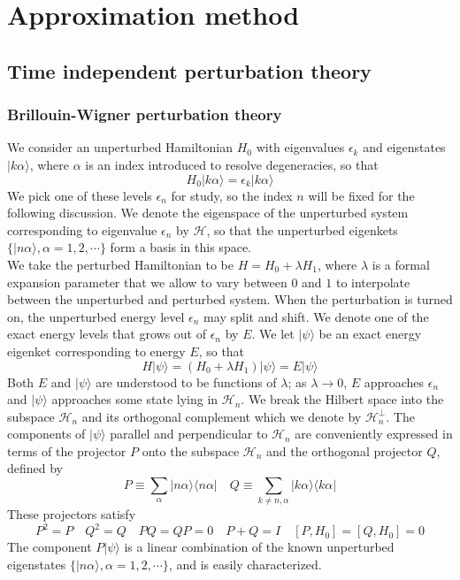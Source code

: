 \chapter{Approximation method}
\section{Time independent perturbation theory}
\subsection{Brillouin-Wigner perturbation theory}
We consider an unperturbed Hamiltonian $H_0$ with eigenvalues $\epsilon_k$ and eigenstates $|k\alpha\rangle$, where $\alpha$ is an index introduced to resolve degeneracies, so that
\[H_0 |k\alpha\rangle = \epsilon_k |k\alpha\rangle\]
We pick one of these levels $\epsilon_n$ for study, so the index $n$ will be fixed for the following discussion. We denote the eigenspace of the unperturbed system corresponding to eigenvalue  $\epsilon_n$ by $\mathcal{H}$, so that the unperturbed eigenkets
$\{ |n\alpha\rangle, \alpha = 1,2,\cdots\}$ form a basis in this space.\\
We take the perturbed Hamiltonian to be $H = H_0 + \lambda H_1$, where $\lambda$ is a formal expansion parameter that we allow to vary between $0$ and $1$ to interpolate between the unperturbed and perturbed system. When the perturbation is turned on, the unperturbed energy level $\epsilon_n$ may split and shift. We denote one of the exact energy levels that grows out of $\epsilon_n$ by $E$. We let $|\psi\rangle$ be an exact energy eigenket corresponding to energy $E$, so that
\[H|\psi\rangle = (H_0 + \lambda H_1)|\psi\rangle = E|\psi\rangle\]
Both $E$ and $|\psi\rangle$ are understood to be functions of $\lambda$; as $\lambda \to 0$, $E$ approaches $\epsilon_n$ and $|\psi\rangle$ approaches some state lying in $\mathcal{H}_n$. We break the Hilbert space into the subspace $\mathcal{H}_n$ and its orthogonal complement which we denote by $\mathcal{H}_n^{\bot}$. The components of $|\psi\rangle$ parallel and perpendicular to $\mathcal{H}_n$ are conveniently expressed in terms of the projector $P$ onto the subspace $\mathcal{H}_n$ and the orthogonal projector $Q$, defined by
\[P \equiv \sum_{\alpha} |n\alpha\rangle \langle n\alpha| \quad Q \equiv \sum_{k \neq n,\alpha} |k\alpha\rangle \langle k\alpha|\]
These projectors satisfy
\[P^2=P \quad Q^2=Q \quad PQ=QP=0 \quad P+Q=I \quad [P,H_0]=[Q,H_0]=0\]
The component $P|\psi\rangle$ is a linear combination of the known unperturbed eigenstates $\{ |n\alpha\rangle, \alpha = 1,2,\cdots\}$, and is easily characterized. 
